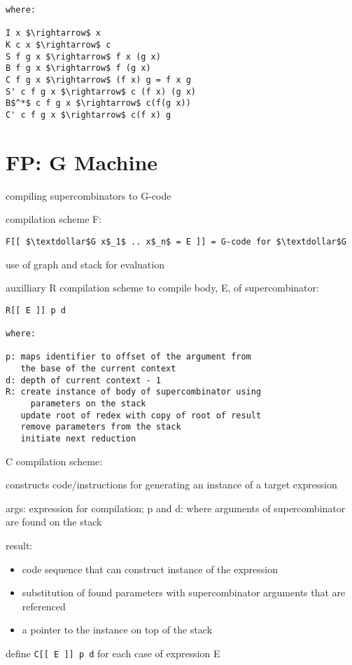 \documentclass[8pt]{extarticle}
\begin{document}
\begin{multicols*}{2}
\begin{lstlisting}
where:

I x $\rightarrow$ x
K c x $\rightarrow$ c
S f g x $\rightarrow$ f x (g x)
B f g x $\rightarrow$ f (g x)
C f g x $\rightarrow$ (f x) g = f x g
S' c f g x $\rightarrow$ c (f x) (g x)
B$^*$ c f g x $\rightarrow$ c(f(g x))
C' c f g x $\rightarrow$ c(f x) g
\end{lstlisting}

\vfill\null
\columnbreak

\section{FP: G Machine}

compiling supercombinators to G-code

compilation scheme F:

\begin{lstlisting}
F[[ $\textdollar$G x$_1$ .. x$_n$ = E ]] = G-code for $\textdollar$G
\end{lstlisting}

use of graph and stack for evaluation

auxilliary R compilation scheme to compile body, E, of supercombinator:
\begin{lstlisting}
R[[ E ]] p d

where:

p: maps identifier to offset of the argument from
   the base of the current context
d: depth of current context - 1
R: create instance of body of supercombinator using
     parameters on the stack
   update root of redex with copy of root of result
   remove parameters from the stack
   initiate next reduction
\end{lstlisting}

C compilation scheme:

constructs code/instructions for generating an instance of a target expression

args: expression for compilation; p and d: where arguments of supercombinator are found on the stack

result:
\begin{itemize}
\item code sequence that can construct instance of the expression
\item substitution of found parameters with supercombinator arguments that are referenced
\item a pointer to the instance on top of the stack
\end{itemize}

define \verb|C[[ E ]] p d| for each case of expression E


\end{multicols*}
\end{document}
